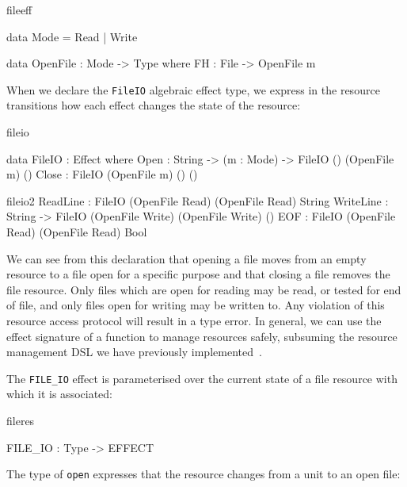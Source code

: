 \begin{SaveVerbatim}{fileeff}

data Mode = Read | Write

data OpenFile : Mode -> Type where
     FH : File -> OpenFile m

\end{SaveVerbatim}

\noindent
When we declare the \texttt{FileIO} algebraic effect type, we express in
the resource transitions how each effect changes the state of the resource:

\begin{SaveVerbatim}{fileio}

data FileIO : Effect where
     Open  : String -> (m : Mode) -> 
             FileIO () (OpenFile m) ()
     Close : FileIO (OpenFile m) () ()
\end{SaveVerbatim}

\begin{SaveVerbatim}{fileio2}
     ReadLine  : FileIO (OpenFile Read)  
                        (OpenFile Read) String
     WriteLine : String -> 
                 FileIO (OpenFile Write) 
                        (OpenFile Write) ()
     EOF       : FileIO (OpenFile Read)  
                        (OpenFile Read) Bool

\end{SaveVerbatim}

\noindent
We can see from this declaration that opening a file moves from an empty
resource to a file open for a specific purpose and that closing a file removes
the file resource. Only files which are open for reading may be read, or tested
for end of file, and only files open for writing may be written to. Any
violation of this resource access protocol will result in a type error.
In general, we can use the effect signature of a function to manage resources
safely, subsuming the resource management DSL we have previously
implemented~\cite{bradyresource}.

The \texttt{FILE\_IO} effect is parameterised over the current state of a
file resource with which it is associated:

\begin{SaveVerbatim}{fileres}

FILE_IO : Type -> EFFECT

\end{SaveVerbatim}

\noindent
The type of \texttt{open} expresses that the resource changes from a unit
to an open file:

